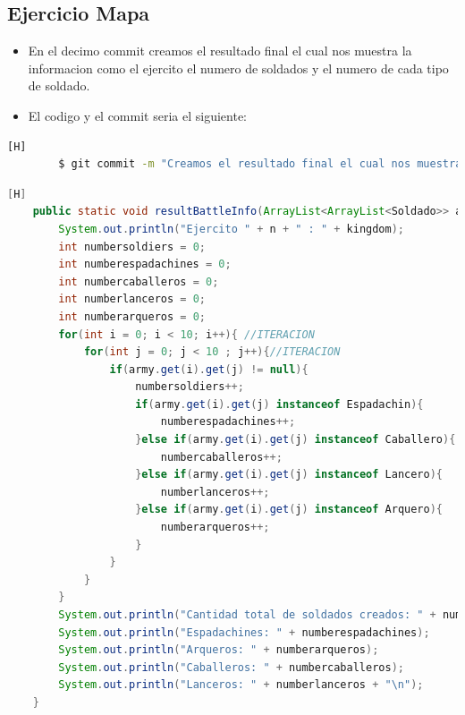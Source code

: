 \documentclass{article}
\begin{document}
	\subsection{Ejercicio Mapa}
	\begin{itemize}	
		\item En el decimo commit creamos el resultado final el cual nos muestra la informacion como el ejercito el numero de soldados y el numero de cada tipo de soldado.
		\item El codigo y el commit seria el siguiente:
	\end{itemize}	
	\begin{lstlisting}[language=bash,caption={Commit}][H]
		$ git commit -m "Creamos el resultado final el cual nos muestra la informacion como el ejercito el numero de soldados y el numero de cada tipo de soldado"
	\end{lstlisting}	
	\begin{lstlisting}[language=java,caption={Las lineas de codigos de la clase Mapa creada:}][H]
    public static void resultBattleInfo(ArrayList<ArrayList<Soldado>> army, String kingdom, int n){
        System.out.println("Ejercito " + n + " : " + kingdom);
        int numbersoldiers = 0;
        int numberespadachines = 0;
        int numbercaballeros = 0;
        int numberlanceros = 0;
        int numberarqueros = 0;
        for(int i = 0; i < 10; i++){ //ITERACION
            for(int j = 0; j < 10 ; j++){//ITERACION
                if(army.get(i).get(j) != null){
                    numbersoldiers++;
                    if(army.get(i).get(j) instanceof Espadachin){
                        numberespadachines++;
                    }else if(army.get(i).get(j) instanceof Caballero){
                        numbercaballeros++;
                    }else if(army.get(i).get(j) instanceof Lancero){
                        numberlanceros++;
                    }else if(army.get(i).get(j) instanceof Arquero){
                        numberarqueros++;
                    }
                }
            }
        }
        System.out.println("Cantidad total de soldados creados: " + numbersoldiers);
        System.out.println("Espadachines: " + numberespadachines);
        System.out.println("Arqueros: " + numberarqueros);
        System.out.println("Caballeros: " + numbercaballeros);
        System.out.println("Lanceros: " + numberlanceros + "\n");
    }
	\end{lstlisting}
\end{document}
